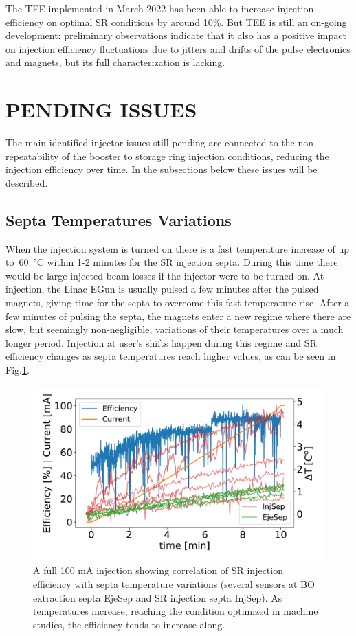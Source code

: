 \documentclass[a4paper,
               keeplastbox,   %
               ]{jacow}
\begin{document}
The TEE implemented in March 2022 has been able to increase injection efficiency on optimal SR conditions by around 10\%. But TEE is still an on-going development: preliminary observations indicate that it also has a positive impact on injection efficiency fluctuations due to jitters and drifts of the pulse electronics and magnets, but its full characterization is lacking.

\section{PENDING ISSUES}
The main identified injector issues still pending are connected to the non-repeatability of the booster to storage ring injection conditions, reducing the injection efficiency over time. In the subsections below these issues will be described.

\subsection{Septa Temperatures Variations}
When the injection system is turned on there is a fast temperature increase of up to~\SI{60}{\degreeCelsius} within 1-2 minutes for the SR injection septa. During this time there would be large injected beam losses if the injector were to be turned on. At injection, the Linac EGun is usually pulsed a few minutes after the pulsed magnets, giving time for the septa to overcome this fast temperature rise. After a few minutes of pulsing the septa, the magnets enter a new regime where there are slow, but seemingly non-negligible, variations of their temperatures over a much longer period. Injection at user's shifts happen during this regime and SR efficiency changes as septa temperatures reach higher values, as can be seen in Fig.\ref{fig:septa-temperatures}.
\begin{figure}[!htb]
   \centering
   \includegraphics*[width=.99\columnwidth]{THPOPT038_f5.pdf}
   \caption{A full 100 mA injection showing correlation of SR injection efficiency with septa temperature variations (several sensors at BO extraction septa EjeSep and SR injection septa InjSep). As temperatures increase, reaching the condition optimized in machine studies, the efficiency tends to increase along.}
   \label{fig:septa-temperatures}
\end{figure}
\end{document}
